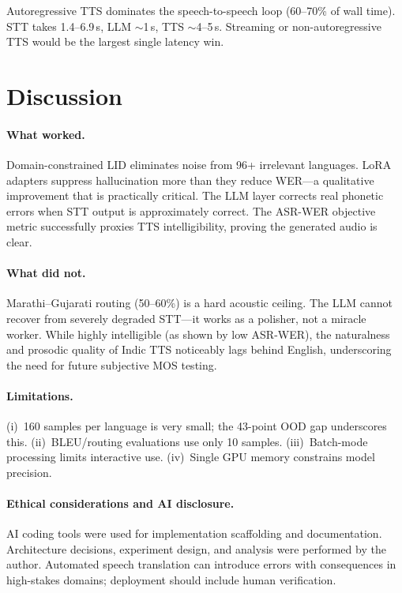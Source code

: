 \documentclass[11pt]{article}
\begin{document}
Autoregressive TTS dominates the speech-to-speech loop (60--70\% of wall time).  STT takes 1.4--6.9\,s, LLM $\sim$1\,s, TTS $\sim$4--5\,s.  Streaming or non-autoregressive TTS would be the largest single latency win.

\section{Discussion}\label{sec:discussion}

\paragraph{What worked.}
Domain-constrained LID eliminates noise from 96+ irrelevant languages.  LoRA adapters suppress hallucination more than they reduce WER---a qualitative improvement that is practically critical.  The LLM layer corrects real phonetic errors when STT output is approximately correct. The ASR-WER objective metric successfully proxies TTS intelligibility, proving the generated audio is clear.

\paragraph{What did not.}
Marathi--Gujarati routing (50--60\%) is a hard acoustic ceiling.  The LLM cannot recover from severely degraded STT---it works as a polisher, not a miracle worker. While highly intelligible (as shown by low ASR-WER), the naturalness and prosodic quality of Indic TTS noticeably lags behind English, underscoring the need for future subjective MOS testing.

\paragraph{Limitations.}
(i)~160 samples per language is very small; the 43-point OOD gap underscores this. (ii)~BLEU/routing evaluations use only 10 samples. (iii)~Batch-mode processing limits interactive use. (iv)~Single GPU memory constrains model precision.

\paragraph{Ethical considerations and AI disclosure.}
AI coding tools were used for implementation scaffolding and documentation.  Architecture decisions, experiment design, and analysis were performed by the author.  Automated speech translation can introduce errors with consequences in high-stakes domains; deployment should include human verification.
\end{document}
